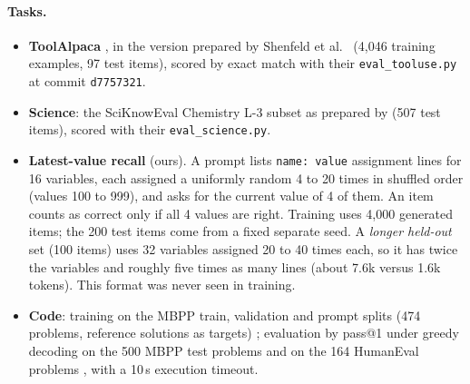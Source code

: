 \documentclass[11pt]{article}
\begin{document}
\paragraph{Tasks.}
\begin{itemize}
\item \textbf{ToolAlpaca} \citep{tang2023toolalpaca}, in the version prepared by Shenfeld et al.\ \citep{shenfeld2026sdft} (4,046 training examples, 97 test items), scored by exact match with their \texttt{eval\_tooluse.py} at commit \texttt{d7757321}.
\item \textbf{Science}: the SciKnowEval Chemistry L-3 subset \citep{feng2024sciknoweval} as prepared by \citep{shenfeld2026sdft} (507 test items), scored with their \texttt{eval\_science.py}.
\item \textbf{Latest-value recall} (ours). A prompt lists \texttt{name: value} assignment lines for 16 variables, each assigned a uniformly random 4 to 20 times in shuffled order (values 100 to 999), and asks for the current value of 4 of them. An item counts as correct only if all 4 values are right. Training uses 4,000 generated items; the 200 test items come from a fixed separate seed. A \emph{longer held-out} set (100 items) uses 32 variables assigned 20 to 40 times each, so it has twice the variables and roughly five times as many lines (about 7.6k versus 1.6k tokens). This format was never seen in training.
\item \textbf{Code}: training on the MBPP train, validation and prompt splits (474 problems, reference solutions as targets) \citep{austin2021mbpp}; evaluation by pass@1 under greedy decoding on the 500 MBPP test problems and on the 164 HumanEval problems \citep{chen2021humaneval}, with a 10\,s execution timeout.
\end{itemize}
\end{document}
